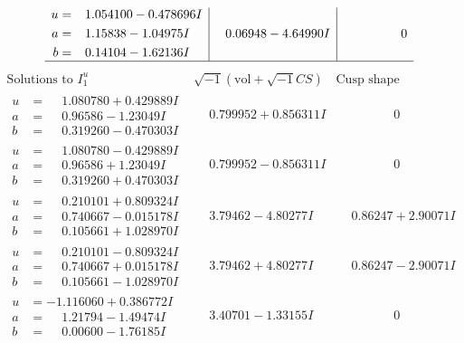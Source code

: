 \documentclass[1p]{elsarticle_modified}
\theoremstyle{definition}
\newcommand{\I}{\sqrt{-1}}
\begin{document}
$$\begin{array}{c|c|c}
\begin{aligned}
u &= \phantom{-}1.054100 - 0.478696 I \\
a &= \phantom{-}1.15838 - 1.04975 I \\
b &= \phantom{-}0.14104 - 1.62136 I\end{aligned}
 & \phantom{-}0.06948 - 4.64990 I & \phantom{-0.000000 } 0\\
 \hline 
 \end{array}$$\newpage$$\begin{array}{c|c|c}  
\text{Solutions to }I^u_{1}& \I (\text{vol} + \sqrt{-1}CS) & \text{Cusp shape}\\
 \hline 
\begin{aligned}
u &= \phantom{-}1.080780 + 0.429889 I \\
a &= \phantom{-}0.96586 - 1.23049 I \\
b &= \phantom{-}0.319260 - 0.470303 I\end{aligned}
 & \phantom{-}0.799952 + 0.856311 I & \phantom{-0.000000 } 0 \\ \hline\begin{aligned}
u &= \phantom{-}1.080780 - 0.429889 I \\
a &= \phantom{-}0.96586 + 1.23049 I \\
b &= \phantom{-}0.319260 + 0.470303 I\end{aligned}
 & \phantom{-}0.799952 - 0.856311 I & \phantom{-0.000000 } 0 \\ \hline\begin{aligned}
u &= \phantom{-}0.210101 + 0.809324 I \\
a &= \phantom{-}0.740667 - 0.015178 I \\
b &= \phantom{-}0.105661 + 1.028970 I\end{aligned}
 & \phantom{-}3.79462 - 4.80277 I & \phantom{-}0.86247 + 2.90071 I \\ \hline\begin{aligned}
u &= \phantom{-}0.210101 - 0.809324 I \\
a &= \phantom{-}0.740667 + 0.015178 I \\
b &= \phantom{-}0.105661 - 1.028970 I\end{aligned}
 & \phantom{-}3.79462 + 4.80277 I & \phantom{-}0.86247 - 2.90071 I \\ \hline\begin{aligned}
u &= -1.116060 + 0.386772 I \\
a &= \phantom{-}1.21794 - 1.49474 I \\
b &= \phantom{-}0.00600 - 1.76185 I\end{aligned}
 & \phantom{-}3.40701 - 1.33155 I & \phantom{-0.000000 } 0 \\ \hline\begin{aligned}

\end{aligned}
\end{array}$$
\end{document}
